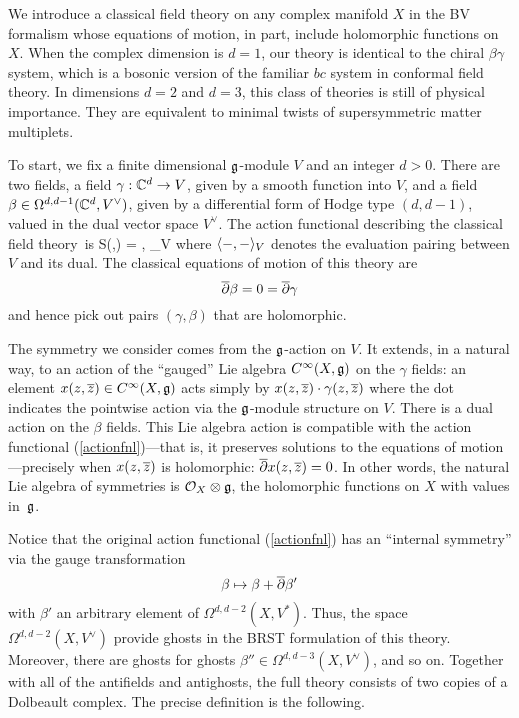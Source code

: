 We introduce a classical field theory on any complex manifold $X$ in the BV formalism whose equations of motion, in part, include holomorphic functions on $X$.
When the complex dimension is $d = 1$, our theory is identical to the chiral $\beta\gamma$ system, 
which is a bosonic version of the familiar $bc$ system in conformal field theory. 
In dimensions $d=2$ and $d=3$, this class of theories is still of physical importance.
They are equivalent to minimal twists of supersymmetric matter multiplets. 

To start, we fix a finite dimensional $\mathfrak g$-module $V$ and an integer $d > 0$.
There are two fields, a field $\gamma : \mathbb C^d \to V$, given by a smooth function into $V$, and
a field $\beta \in \Omega^{d,d-1}(\mathbb C^d, V^\vee)$, 
given by a differential form of Hodge type $(d,d-1)$, valued in the dual vector space $V^\vee$. 
The action functional describing the classical field theory~is
\beqn\label{actionfnl}
S(\gamma,\beta) = \int \<\beta, \dbar\gamma\>_V
\eeqn
where $\langle-,-\rangle_V$ denotes the evaluation pairing between $V$ and its dual. 
The classical equations of motion of this theory are 
\[
\overline{\partial} \beta = 0 =\overline{\partial} \gamma
\]
and hence pick out pairs $(\gamma,\beta)$ that are holomorphic. 

The symmetry we consider comes from the $\mathfrak g$-action on $V$. 
It extends, in a natural way, to an action of the ``gauged'' Lie algebra $C^\infty(X, \mathfrak g)$ on the $\gamma$ fields: an element $x(z,\overline{z}) \in C^\infty(X,\mathfrak g)$ acts simply by $x(z,\overline{z}) \cdot \gamma(z,\overline{z})$ where the dot indicates the pointwise action via the $\mathfrak g$-module structure on $V$. 
There is a dual action on the $\beta$ fields.
This Lie algebra action is compatible with the action functional (\ref{actionfnl})---that is, it preserves solutions to the equations of motion---precisely when $x(z,\overline{z})$ is holomorphic: $\overline{\partial} x(z,\overline{z}) = 0$. 
In other words, the natural Lie algebra of symmetries is $\mathcal O_X \otimes \mathfrak g$, the holomorphic functions on $X$ with values in~$\mathfrak g$.

Notice that the original action functional (\ref{actionfnl}) has an ``internal symmetry'' via the gauge transformation
\[
\beta \mapsto \beta + \overline{\partial} \beta' 
\]
with $\beta'$ an arbitrary element of $\Omega^{d,d-2} (X, V^*)$. 
Thus, the space $\Omega^{d,d-2} (X, V^\vee)$ provide ghosts in the BRST formulation of this theory. 
Moreover, there are ghosts for ghosts $\beta'' \in \Omega^{d,d-3}(X , V^\vee)$, and so on.
Together with all of the antifields and antighosts, the full theory consists of two copies of a Dolbeault complex.
The precise definition is the following.

